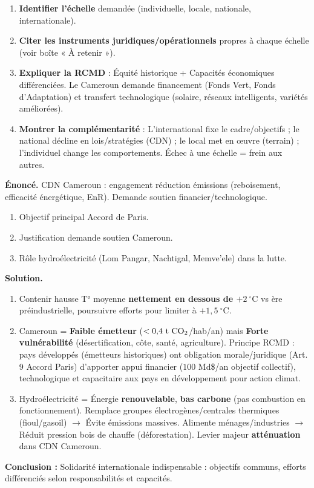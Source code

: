 \documentclass[11pt]{article}
\begin{document}
\begin{methode}
\begin{enumerate}
\item \textbf{Identifier l'échelle} demandée (individuelle, locale, nationale, internationale).
\item \textbf{Citer les instruments juridiques/opérationnels} propres à chaque échelle (voir boîte « À retenir »).
\item \textbf{Expliquer la RCMD} : Équité historique + Capacités économiques différenciées. Le Cameroun demande financement (Fonds Vert, Fonds d'Adaptation) et transfert technologique (solaire, réseaux intelligents, variétés améliorées).
\item \textbf{Montrer la complémentarité} : L'international fixe le cadre/objectifs ; le national décline en lois/stratégies (CDN) ; le local met en œuvre (terrain) ; l'individuel change les comportements. Échec à une échelle = frein aux autres.
\end{enumerate}
\end{methode}

\begin{exoresolu}
\textbf{Énoncé.} CDN Cameroun : engagement réduction émissions (reboisement, efficacité énergétique, EnR). Demande soutien financier/technologique.
\begin{enumerate}
\item Objectif principal Accord de Paris.
\item Justification demande soutien Cameroun.
\item Rôle hydroélectricité (Lom Pangar, Nachtigal, Memve'ele) dans la lutte.
\end{enumerate}
\tcblower
\textbf{Solution.}
\begin{enumerate}
\item Contenir hausse T° moyenne \textbf{nettement en dessous de $+2\ ^\circ\text{C}$} vs ère préindustrielle, poursuivre efforts pour limiter à $+1{,}5\ ^\circ\text{C}$.
\item Cameroun = \textbf{Faible émetteur} ($<0{,}4\ \text{t}\ \ce{CO2}$/hab/an) mais \textbf{Forte vulnérabilité} (désertification, côte, santé, agriculture). Principe RCMD : pays développés (émetteurs historiques) ont obligation morale/juridique (Art. 9 Accord Paris) d'apporter appui financier ($100$ Md\$/an objectif collectif), technologique et capacitaire aux pays en développement pour action climat.
\item Hydroélectricité = Énergie \textbf{renouvelable}, \textbf{bas carbone} (pas combustion en fonctionnement). Remplace groupes électrogènes/centrales thermiques (fioul/gasoil) $\rightarrow$ Évite émissions  massives. Alimente ménages/industries $\rightarrow$ Réduit pression bois de chauffe (déforestation). Levier majeur \textbf{atténuation} dans CDN Cameroun.
\end{enumerate}
\textbf{Conclusion :} Solidarité internationale indispensable : objectifs communs, efforts différenciés selon responsabilités et capacités.
\end{exoresolu}
\end{document}
